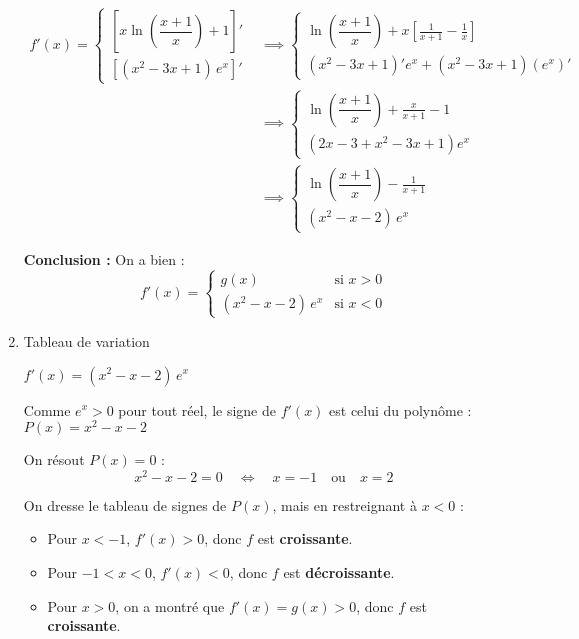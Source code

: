 \documentclass[12pt,a4paper]{article}
\begin{document}
\begin{enumerate}
\(
\begin{aligned}
    f'(x) = 
\begin{cases}
 \left[x\ln\left( \dfrac{x+1}{x} \right) + 1\right]' \\
\left[(x^2 - 3x + 1)\, e^x\right]' 
\end{cases}
&\implies
\begin{cases}
 \ln\left( \dfrac{x+1}{x} \right)+x\left[\frac{1}{x+1}-\frac{1}{x}\right] \\
\left( x^2 - 3x + 1 \right)' e^x + \left( x^2 - 3x + 1 \right) (e^x)'
\end{cases}\\
&\implies
\begin{cases}
 \ln\left( \dfrac{x+1}{x} \right)+\frac{x}{x+1}-1\\
\left( 2x - 3 + x^2 - 3x + 1 \right) e^x
\end{cases}\\
&\implies
\begin{cases}
 \ln\left( \dfrac{x+1}{x} \right)-\frac{1}{x+1}\\
 (x^2 - x - 2)\, e^x 
\end{cases}
\end{aligned}
\)

\textbf{Conclusion :} On a bien :
\[
f'(x) = 
\begin{cases}
g(x) & \text{si } x > 0 \\
(x^2 - x - 2)\, e^x & \text{si } x < 0
\end{cases}
\]
\item Tableau de variation

\(f'(x) = (x^2 - x - 2)\, e^x\)

Comme \( e^x > 0 \) pour tout réel, le signe de \( f'(x) \) est celui du polynôme :\(P(x) = x^2 - x - 2\)

On résout \( P(x) = 0 \) :
\[
x^2 - x - 2 = 0 \quad \Longleftrightarrow \quad x = -1 \quad \text{ou} \quad x = 2
\]

On dresse le tableau de signes de \( P(x) \), mais en restreignant à \( x < 0 \) :


\begin{itemize}
    \item Pour \( x < -1 \), \( f'(x) > 0 \), donc \( f \) est \textbf{croissante}.
    \item Pour \( -1 < x < 0 \), \( f'(x) < 0 \), donc \( f \) est \textbf{décroissante}.
    \item Pour \( x > 0 \), on a montré que \( f'(x) = g(x) > 0 \), donc \( f \) est \textbf{croissante}.
\end{itemize}


\end{enumerate}
\end{document}
